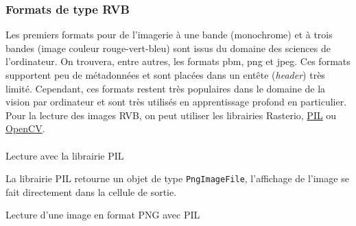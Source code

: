 \documentclass[
  11pt,
  letterpaper,
  open=any,
  twoside=false,
  french]{scrbook}
\makeatletter
\let\oldparagraph\paragraph
\renewcommand{\paragraph}{
    \@ifstar
      \xxxParagraphStar
      \xxxParagraphNoStar
  }
\newcommand{\xxxParagraphStar}[1]{\oldparagraph*{#1}\mbox{}}
\newcommand{\xxxParagraphNoStar}[1]{\oldparagraph{#1}\mbox{}}
\newenvironment{Shaded}{\begin{snugshade}}{\end{snugshade}}
\newcommand{\BuiltInTok}[1]{\textcolor[rgb]{0.00,0.23,0.31}{#1}}
\newcommand{\ImportTok}[1]{\textcolor[rgb]{0.00,0.46,0.62}{#1}}
\newcommand{\NormalTok}[1]{\textcolor[rgb]{0.00,0.23,0.31}{#1}}
\newcommand{\OperatorTok}[1]{\textcolor[rgb]{0.37,0.37,0.37}{#1}}
\newcommand{\StringTok}[1]{\textcolor[rgb]{0.13,0.47,0.30}{#1}}
\makeatother
\begin{document}
\subsubsection{Formats de type RVB}\label{formats-de-type-rvb}

Les premiers formats pour de l'imagerie à une bande (monochrome) et à
trois bandes (image couleur rouge-vert-bleu) sont issus du domaine des
sciences de l'ordinateur. On trouvera, entre autres, les formats pbm,
png et jpeg. Ces formats supportent peu de métadonnées et sont placées
dans un entête (\emph{header}) très limité. Cependant, ces formats
restent très populaires dans le domaine de la vision par ordinateur et
sont très utilisés en apprentissage profond en particulier. Pour la
lecture des images RVB, on peut utiliser les librairies Rasterio,
\href{https://he-arc.github.io/livre-python/pillow/index.html}{PIL} ou
\href{https://docs.opencv.org/4.10.0/index.html}{OpenCV}.

\paragraph{Lecture avec la librairie
PIL}\label{lecture-avec-la-librairie-pil}

La librairie PIL retourne un objet de type \texttt{PngImageFile},
l'affichage de l'image se fait directement dans la cellule de sortie.

\begin{codelisting}

\caption{\label{lst-lecture-PIL-PNG}Lecture d'une image en format PNG
avec PIL}

\centering{

\begin{Shaded}
\begin{Highlighting}[]
\ImportTok{from}\NormalTok{ PIL }\ImportTok{import}\NormalTok{ Image}
\NormalTok{img }\OperatorTok{=}\NormalTok{ Image.}\BuiltInTok{open}\NormalTok{(}\StringTok{\textquotesingle{}modis{-}aqua.PNG\textquotesingle{}}\NormalTok{)}
\NormalTok{img}
\end{Highlighting}
\end{Shaded}

}

\end{codelisting}%
\end{document}
